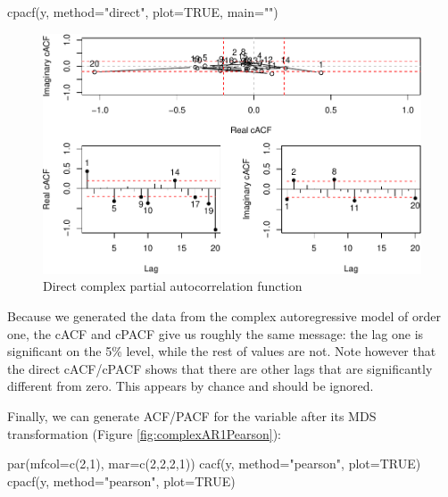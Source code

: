 \documentclass[
]{book}
\newenvironment{Shaded}{\begin{snugshade}}{\end{snugshade}}
\newcommand{\AttributeTok}[1]{\textcolor[rgb]{0.77,0.63,0.00}{#1}}
\newcommand{\ConstantTok}[1]{\textcolor[rgb]{0.00,0.00,0.00}{#1}}
\newcommand{\DecValTok}[1]{\textcolor[rgb]{0.00,0.00,0.81}{#1}}
\newcommand{\FunctionTok}[1]{\textcolor[rgb]{0.00,0.00,0.00}{#1}}
\newcommand{\NormalTok}[1]{#1}
\newcommand{\StringTok}[1]{\textcolor[rgb]{0.31,0.60,0.02}{#1}}
\begin{document}
\begin{Shaded}
\begin{Highlighting}[]
\FunctionTok{cpacf}\NormalTok{(y, }\AttributeTok{method=}\StringTok{"direct"}\NormalTok{, }\AttributeTok{plot=}\ConstantTok{TRUE}\NormalTok{, }\AttributeTok{main=}\StringTok{""}\NormalTok{)}
\end{Highlighting}
\end{Shaded}

\begin{figure}
\centering
\includegraphics{Svetunkov---Svetunkov---Complex-Valued-Econometrics_files/figure-latex/complexAR1PACFDir-1.pdf}
\caption{\label{fig:complexAR1PACFDir}Direct complex partial autocorrelation function}
\end{figure}

Because we generated the data from the complex autoregressive model of order one, the cACF and cPACF give us roughly the same message: the lag one is significant on the 5\% level, while the rest of values are not. Note however that the direct cACF/cPACF shows that there are other lags that are significantly different from zero. This appears by chance and should be ignored.

Finally, we can generate ACF/PACF for the variable after its MDS transformation (Figure \ref{fig:complexAR1Pearson}):

\begin{Shaded}
\begin{Highlighting}[]
\FunctionTok{par}\NormalTok{(}\AttributeTok{mfcol=}\FunctionTok{c}\NormalTok{(}\DecValTok{2}\NormalTok{,}\DecValTok{1}\NormalTok{), }\AttributeTok{mar=}\FunctionTok{c}\NormalTok{(}\DecValTok{2}\NormalTok{,}\DecValTok{2}\NormalTok{,}\DecValTok{2}\NormalTok{,}\DecValTok{1}\NormalTok{))}
\FunctionTok{cacf}\NormalTok{(y, }\AttributeTok{method=}\StringTok{"pearson"}\NormalTok{, }\AttributeTok{plot=}\ConstantTok{TRUE}\NormalTok{)}
\FunctionTok{cpacf}\NormalTok{(y, }\AttributeTok{method=}\StringTok{"pearson"}\NormalTok{, }\AttributeTok{plot=}\ConstantTok{TRUE}\NormalTok{)}
\end{Highlighting}
\end{Shaded}
\end{document}
